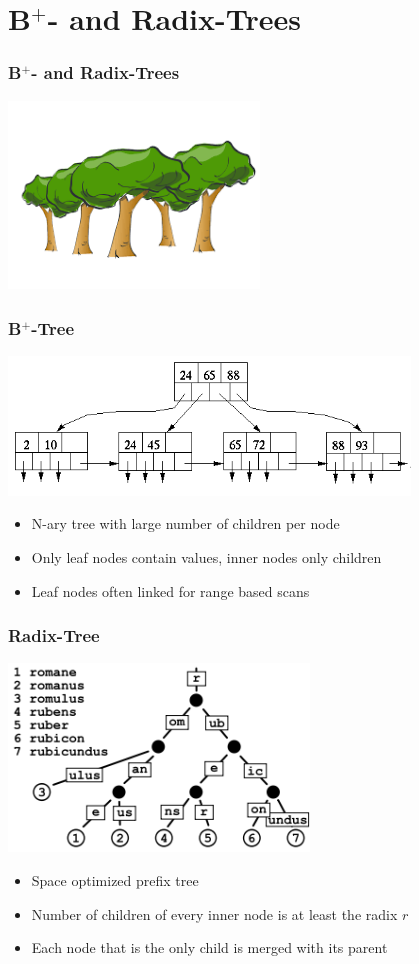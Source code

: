\documentclass{beamer}
\begin{document}
\section{B$^{+}$- and Radix-Trees}
\begin{frame}
\frametitle{B$^{+}$- and Radix-Trees}
\begin{center}
	\includegraphics[width=0.5\textwidth]{img/forest.png}
\end{center}
\end{frame}
\begin{frame}
\frametitle{B$^{+}$-Tree}
	\begin{center}
		\includegraphics[width=0.8\textwidth]{img/b_tree.png}
	\end{center}
	\begin{itemize}
		\item N-ary tree with large number of children per node
		\item Only leaf nodes contain values, inner nodes only children
		\item Leaf nodes often linked for range based scans
	\end{itemize}
\end{frame}
\begin{frame}
\frametitle{Radix-Tree}
	\begin{center}
	\includegraphics[width=0.6\textwidth]{img/radix_tree.png}
	\end{center}
	\begin{itemize}
		\item Space optimized prefix tree
		\item Number of children of every inner node is at least the radix $r$
		\item Each node that is the only child is merged with its parent
	\end{itemize}
\end{frame}
\end{document}

